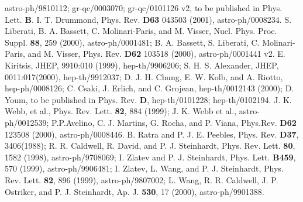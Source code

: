 \documentclass[a4paper,12pt]{article}
\begin{document}
\begin{thebibliography}{100}
astro-ph/9810112; gr-qc/0003070; gr-qc/0101126 v2, to be published in Phys.
Lett. {\bf B}.
 I. T. Drummond, Phys. Rev. {\bf D63}
043503 (2001), astro-ph/0008234.
 S. Liberati, B. A.
Bassett, C. Molinari-Paris, and M. Visser, Nucl. Phys. Proc. Suppl. {\bf
88}, 259 (2000), astro-ph/0001481; B. A. Bassett, S. Liberati, C.
Molinari-Paris, and M. Visser, Phys. Rev. {\bf D62} 103518 (2000),
astro-ph/0001441 v2.
 E. Kiritsis, JHEP, 9910:010 (1999),
hep-th/9906206; S. H. S. Alexander, JHEP, 0011:017(2000), hep-th/9912037;
D. J. H. Chung, E. W. Kolb, and A. Riotto, hep-ph/0008126;
C. Csaki, J. Erlich, and C. Grojean, hep-th/0012143 (2000); D. Youm, to be
published in Phys. Rev. {\bf D}, hep-th/0101228; hep-th/0102194.
 J. K. Webb, et al., Phys. Rev. Lett. {\bf 82}, 884 (1999);
J. K. Webb et al., astro-ph/0012539; P.P.Avelino, C. J. Martins, G. Rocha,
and P. Viana, Phys.Rev. {\bf D62} 123508 (2000), astro-ph/0008446.
 B. Ratra and P. J. E. Peebles, Phys. Rev. {\bf D37},
3406(1988); R. R. Caldwell, R. David, and P. J. Steinhardt, Phys. Rev.
Lett. {\bf 80}, 1582 (1998), astro-ph/9708069; I. Zlatev and P. J.
Steinhardt, Phys. Lett. {\bf B459}, 570 (1999), astro-ph/9906481; I.
Zlatev, L. Wang, and P. J. Steinhardt, Phys. Rev. Lett. {\bf 82}, 896
(1999), astro-ph/9807002; L. Wang, R. R. Caldwell, J. P. Ostriker, and P.
J. Steinhardt, Ap. J. {\bf 530}, 17 (2000), astro-ph/9901388.

\end{thebibliography}
\end{document}
